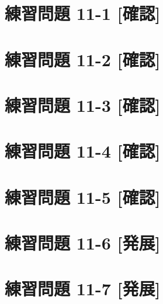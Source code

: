 \documentclass[
]{book}
\begin{document}
\hypertarget{ux7df4ux7fd2ux554fux984c-11-1-ux78baux8a8d}{%
\section*{練習問題 11-1 {[}確認{]}}\label{ux7df4ux7fd2ux554fux984c-11-1-ux78baux8a8d}}

\hypertarget{ux7df4ux7fd2ux554fux984c-11-2-ux78baux8a8d}{%
\section*{練習問題 11-2 {[}確認{]}}\label{ux7df4ux7fd2ux554fux984c-11-2-ux78baux8a8d}}

\hypertarget{ux7df4ux7fd2ux554fux984c-11-3-ux78baux8a8d}{%
\section*{練習問題 11-3 {[}確認{]}}\label{ux7df4ux7fd2ux554fux984c-11-3-ux78baux8a8d}}

\hypertarget{ux7df4ux7fd2ux554fux984c-11-4-ux78baux8a8d}{%
\section*{練習問題 11-4 {[}確認{]}}\label{ux7df4ux7fd2ux554fux984c-11-4-ux78baux8a8d}}

\hypertarget{ux7df4ux7fd2ux554fux984c-11-5-ux78baux8a8d}{%
\section*{練習問題 11-5 {[}確認{]}}\label{ux7df4ux7fd2ux554fux984c-11-5-ux78baux8a8d}}

\hypertarget{ux7df4ux7fd2ux554fux984c-11-6-ux767aux5c55}{%
\section*{練習問題 11-6 {[}発展{]}}\label{ux7df4ux7fd2ux554fux984c-11-6-ux767aux5c55}}

\hypertarget{ux7df4ux7fd2ux554fux984c-11-7-ux767aux5c55}{%
\section*{練習問題 11-7 {[}発展{]}}\label{ux7df4ux7fd2ux554fux984c-11-7-ux767aux5c55}}
\end{document}
